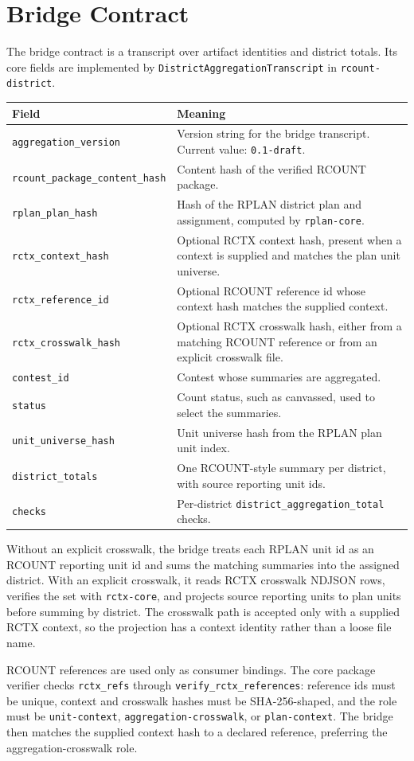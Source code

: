 \section{Bridge Contract}

The bridge contract is a transcript over artifact identities and district
totals. Its core fields are implemented by
\texttt{DistrictAggregationTranscript} in \texttt{rcount-district}.

\begin{center}
\small
\begin{tabularx}{\textwidth}{lX}
\toprule
Field & Meaning \\
\midrule
\texttt{aggregation\_version} & Version string for the bridge transcript. Current value: \texttt{0.1-draft}. \\
\texttt{rcount\_package\_content\_hash} & Content hash of the verified RCOUNT package. \\
\texttt{rplan\_plan\_hash} & Hash of the RPLAN district plan and assignment, computed by \texttt{rplan-core}. \\
\texttt{rctx\_context\_hash} & Optional RCTX context hash, present when a context is supplied and matches the plan unit universe. \\
\texttt{rctx\_reference\_id} & Optional RCOUNT reference id whose context hash matches the supplied context. \\
\texttt{rctx\_crosswalk\_hash} & Optional RCTX crosswalk hash, either from a matching RCOUNT reference or from an explicit crosswalk file. \\
\texttt{contest\_id} & Contest whose summaries are aggregated. \\
\texttt{status} & Count status, such as canvassed, used to select the summaries. \\
\texttt{unit\_universe\_hash} & Unit universe hash from the RPLAN plan unit index. \\
\texttt{district\_totals} & One RCOUNT-style summary per district, with source reporting unit ids. \\
\texttt{checks} & Per-district \texttt{district\_aggregation\_total} checks. \\
\bottomrule
\end{tabularx}
\end{center}

Without an explicit crosswalk, the bridge treats each RPLAN unit id as an RCOUNT
reporting unit id and sums the matching summaries into the assigned district.
With an explicit crosswalk, it reads RCTX crosswalk NDJSON rows, verifies the
set with \texttt{rctx-core}, and projects source reporting units to plan units
before summing by district. The crosswalk path is accepted only with a supplied
RCTX context, so the projection has a context identity rather than a loose file
name.

RCOUNT references are used only as consumer bindings. The core package verifier
checks \texttt{rctx\_refs} through \texttt{verify\_rctx\_references}: reference
ids must be unique, context and crosswalk hashes must be SHA-256-shaped, and the
role must be \texttt{unit-context}, \texttt{aggregation-crosswalk}, or
\texttt{plan-context}. The bridge then matches the supplied context hash to a
declared reference, preferring the aggregation-crosswalk role.
